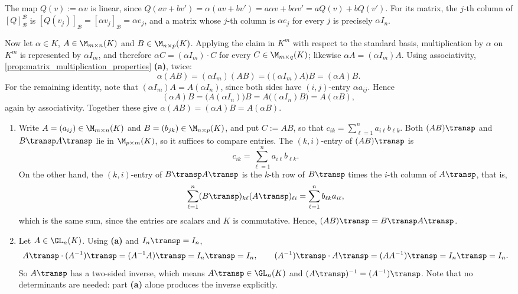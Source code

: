 \begin{exercisesolution}
\label{sol:scaling_map_matrix_d}
The map $Q(v) := \alpha v$ is linear, since $Q(a v + b v') = \alpha(a v + b v') = a \alpha v + b \alpha v' = a Q(v) + b Q(v')$. For its matrix, the $j$-th column of $[Q]_{\mathcal{B}}^{\mathcal{B}}$ is $[Q(v_j)]_{\mathcal{B}} = [\alpha v_j]_{\mathcal{B}} = \alpha e_j$, and a matrix whose $j$-th column is $\alpha e_j$ for every $j$ is precisely $\alpha I_n$.

Now let $\alpha \in K$, $A \in \M_{m \times n}(K)$ and $B \in \M_{n \times p}(K)$. Applying the claim in $K^m$ with respect to the standard basis, multiplication by $\alpha$ on $K^m$ is represented by $\alpha I_m$, and therefore $\alpha C = (\alpha I_m) \cdot C$ for every $C \in \M_{m \times q}(K)$; likewise $\alpha A = (\alpha I_m) A$. Using associativity, \cref{prop:matrix_multiplication_properties} \textbf{(a)}, twice:
\[
\alpha (AB) = (\alpha I_m)(AB) = \big((\alpha I_m) A\big) B = (\alpha A) B.
\]
For the remaining identity, note that $(\alpha I_m) A = A (\alpha I_n)$, since both sides have $(i,j)$-entry $\alpha a_{ij}$. Hence
\[
(\alpha A) B = \big(A (\alpha I_n)\big) B = A \big((\alpha I_n) B\big) = A (\alpha B),
\]
again by associativity. Together these give $\alpha(AB) = (\alpha A)B = A(\alpha B)$.
\end{exercisesolution}

\begin{exercisesolution}
\label{sol:transpose_properties_multiplication}
\begin{enumerate}[label=\textbf{(\alph*)}]
    \item Write $A = (a_{ij}) \in \M_{m \times n}(K)$ and $B = (b_{jk}) \in \M_{n \times p}(K)$, and put $C := AB$, so that $c_{ik} = \sum_{\ell=1}^{n} a_{i\ell} b_{\ell k}$. Both $(AB)\transp$ and $B\transp A\transp$ lie in $\M_{p \times m}(K)$, so it suffices to compare entries. The $(k,i)$-entry of $(AB)\transp$ is
    \[
    c_{ik} = \sum_{\ell=1}^{n} a_{i\ell} b_{\ell k}.
    \]
    On the other hand, the $(k,i)$-entry of $B\transp A\transp$ is the $k$-th row of $B\transp$ times the $i$-th column of $A\transp$, that is,
    \[
    \sum_{\ell=1}^{n} (B\transp)_{k\ell} (A\transp)_{\ell i} = \sum_{\ell=1}^{n} b_{\ell k} a_{i \ell},
    \]
    which is the same sum, since the entries are scalars and $K$ is commutative. Hence, $(AB)\transp = B\transp A\transp$.
    \item Let $A \in \GL_n(K)$. Using \textbf{(a)} and $I_n\transp = I_n$,
    \[
    A\transp \cdot (A^{-1})\transp = (A^{-1} A)\transp = I_n\transp = I_n, \qquad (A^{-1})\transp \cdot A\transp = (A A^{-1})\transp = I_n\transp = I_n.
    \]
    So $A\transp$ has a two-sided inverse, which means $A\transp \in \GL_n(K)$ and $(A\transp)^{-1} = (A^{-1})\transp$. Note that no determinants are needed: part \textbf{(a)} alone produces the inverse explicitly.
\end{enumerate}
\end{exercisesolution}

